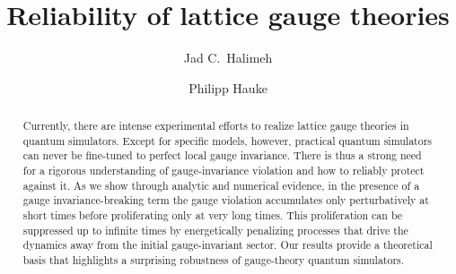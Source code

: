 \documentclass[aps,prl,reprint,twocolumn,superscriptaddress,floatfix,nofootinbib]{revtex4-1}
\begin{document}
	
	\title{Reliability of lattice gauge theories}
	\author{Jad C.~Halimeh}
	
	\author{Philipp Hauke}
	
	\begin{abstract}
		Currently, there are intense experimental efforts to realize lattice gauge theories in quantum simulators. Except for specific models, however, practical quantum simulators can never be fine-tuned to perfect local gauge invariance. There is thus a strong need for a rigorous understanding of gauge-invariance violation and how to reliably protect against it. As we show through analytic and numerical evidence, in the presence of a gauge invariance-breaking term the gauge violation accumulates only perturbatively at short times before proliferating only at very long times. This proliferation can be suppressed up to infinite times by energetically penalizing processes that drive the dynamics away from the initial gauge-invariant sector. Our results provide a theoretical basis that highlights a surprising robustness of gauge-theory quantum simulators.
	\end{abstract}
	
\end{document}
